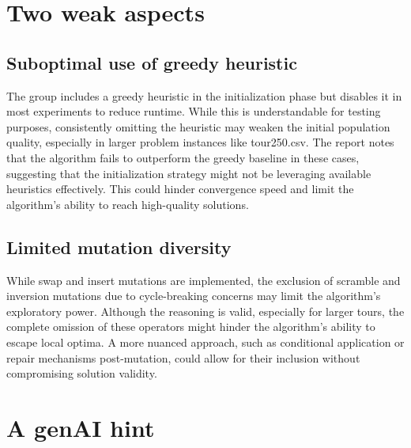 \documentclass[a4paper,10pt]{article}
\newcommand{\ReplaceMe}[1]{{\color{blue}#1}}
\begin{document}
\section{Two weak aspects}


\subsection{Suboptimal use of greedy heuristic}



The group includes a greedy heuristic in the initialization phase but disables it in most experiments to reduce runtime. While this is understandable for testing purposes, consistently omitting the heuristic may weaken the initial population quality, especially in larger problem instances like tour250.csv. The report notes that the algorithm fails to outperform the greedy baseline in these cases, suggesting that the initialization strategy might not be leveraging available heuristics effectively. This could hinder convergence speed and limit the algorithm’s ability to reach high-quality solutions.


\subsection{Limited mutation diversity}

While swap and insert mutations are implemented, the exclusion of scramble and inversion mutations due to cycle-breaking concerns may limit the algorithm’s exploratory power. Although the reasoning is valid, especially for larger tours, the complete omission of these operators might hinder the algorithm’s ability to escape local optima. A more nuanced approach, such as conditional application or repair mechanisms post-mutation, could allow for their inclusion without compromising solution validity.

\section{A genAI hint}
\end{document}
